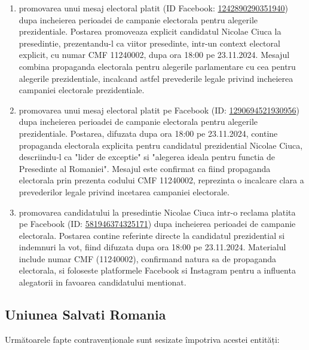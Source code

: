 \documentclass[a4paper,12pt]{article}
\begin{document}
\begin{enumerate}[leftmargin=*, label=\arabic*.)]
    \item promovarea unui mesaj electoral platit (ID Facebook: \href{https://www.facebook.com/ads/library/?id=1242890290351940}{1242890290351940}) dupa incheierea perioadei de campanie electorala pentru alegerile prezidentiale. Postarea promoveaza explicit candidatul Nicolae Ciuca la presedintie, prezentandu-l ca viitor presedinte, intr-un context electoral explicit, cu numar CMF 11240002, dupa ora 18:00 pe 23.11.2024. Mesajul combina propaganda electorala pentru alegerile parlamentare cu cea pentru alegerile prezidentiale, incalcand astfel prevederile legale privind incheierea campaniei electorale prezidentiale.
    \item promovarea unui mesaj electoral platit pe Facebook (ID: \href{https://www.facebook.com/ads/library/?id=1290694521930956}{1290694521930956}) dupa incheierea perioadei de campanie electorala pentru alegerile prezidentiale. Postarea, difuzata dupa ora 18:00 pe 23.11.2024, contine propaganda electorala explicita pentru candidatul prezidential Nicolae Ciuca, descriindu-l ca "lider de exceptie" si "alegerea ideala pentru functia de Presedinte al Romaniei". Mesajul este confirmat ca fiind propaganda electorala prin prezenta codului CMF 11240002, reprezinta o incalcare clara a prevederilor legale privind incetarea campaniei electorale.
    \item promovarea candidatului la presedintie Nicolae Ciuca intr-o reclama platita pe Facebook (ID: \href{https://www.facebook.com/ads/library/?id=581946374325171}{581946374325171}) dupa incheierea perioadei de campanie electorala. Postarea contine referinte directe la candidatul prezidential si indemnuri la vot, fiind difuzata dupa ora 18:00 pe 23.11.2024. Materialul include numar CMF (11240002), confirmand natura sa de propaganda electorala, si foloseste platformele Facebook si Instagram pentru a influenta alegatorii in favoarea candidatului mentionat.
\end{enumerate}

\vspace{0.5cm}

\subsection{Uniunea Salvati Romania}
Următoarele fapte contravenționale sunt sesizate împotriva acestei entități:
\end{document}
